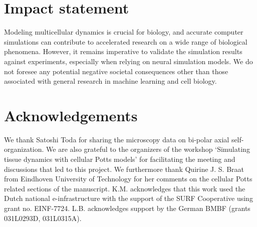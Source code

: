 \section*{Impact statement}

Modeling multicellular dynamics is crucial for biology, and accurate computer simulations can contribute to accelerated research on a wide range of biological phenomena. However, it remains imperative to validate the simulation results against experiments, especially when relying on neural simulation models. We do not foresee any potential negative societal consequences other than those associated with general research in machine learning and cell biology.



\section*{Acknowledgements}
We thank Satoshi Toda for sharing the microscopy data on bi-polar axial self-organization. We are also grateful to the organizers of the workshop `Simulating tissue dynamics with cellular Potts models' for facilitating the meeting and discussions that led to this project. We furthermore thank Quirine J. S. Braat from Eindhoven University of Technology for her comments on the cellular Potts related sections of the manuscript. K.M. acknowledges that this work used the Dutch national e-infrastructure with the support of the SURF Cooperative using grant no. EINF-7724. L.B. acknowledges support by the German BMBF (grants 031L0293D, 031L0315A). 

